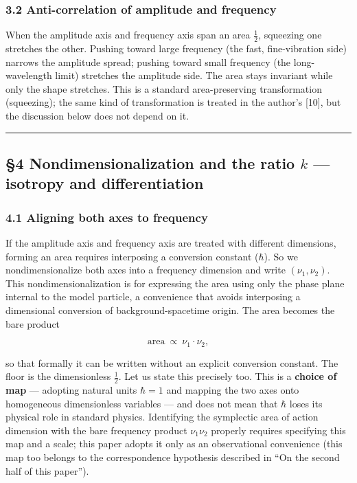 \documentclass[
]{article}
\begin{document}
\subsubsection{3.2 Anti-correlation of amplitude and
frequency}\label{anti-correlation-of-amplitude-and-frequency}

When the amplitude axis and frequency axis span an area \(\tfrac12\),
squeezing one stretches the other. Pushing toward large frequency (the
fast, fine-vibration side) narrows the amplitude spread; pushing toward
small frequency (the long-wavelength limit) stretches the amplitude
side. The area stays invariant while only the shape stretches. This is a
standard area-preserving transformation (squeezing); the same kind of
transformation is treated in the author's {[}10{]}, but the discussion
below does not depend on it.

\begin{center}\rule{0.5\linewidth}{0.5pt}\end{center}

\subsection{\texorpdfstring{§4 Nondimensionalization and the ratio \(k\)
--- isotropy and
differentiation}{§4 Nondimensionalization and the ratio k --- isotropy and differentiation}}\label{nondimensionalization-and-the-ratio-k-isotropy-and-differentiation}

\subsubsection{4.1 Aligning both axes to
frequency}\label{aligning-both-axes-to-frequency}

If the amplitude axis and frequency axis are treated with different
dimensions, forming an area requires interposing a conversion constant
(\(\hbar\)). So we nondimensionalize both axes into a frequency
dimension and write \((\nu_1,\nu_2)\). This nondimensionalization is for
expressing the area using only the phase plane internal to the model
particle, a convenience that avoids interposing a dimensional conversion
of background-spacetime origin. The area becomes the bare product

\[\text{area}\ \propto\ \nu_1\cdot\nu_2,\]

so that formally it can be written without an explicit conversion
constant. The floor is the dimensionless \(\tfrac12\). Let us state this
precisely too. This is a \textbf{choice of map} --- adopting natural
units \(\hbar=1\) and mapping the two axes onto homogeneous
dimensionless variables --- and does not mean that \(\hbar\) loses its
physical role in standard physics. Identifying the symplectic area of
action dimension with the bare frequency product \(\nu_1\nu_2\) properly
requires specifying this map and a scale; this paper adopts it only as
an observational convenience (this map too belongs to the correspondence
hypothesis described in ``On the second half of this paper'').
\end{document}

